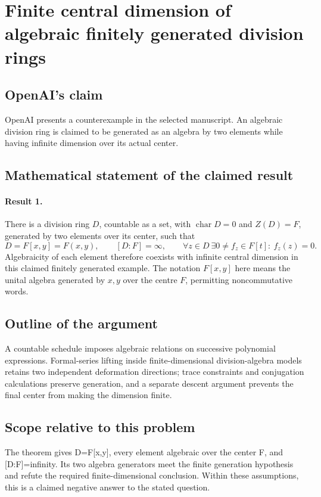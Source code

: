 \documentclass[11pt]{article}
\begin{document}
\section*{Finite central dimension of algebraic finitely generated division rings}

\subsection{OpenAI's claim}
OpenAI presents a counterexample in the selected manuscript. An algebraic division ring is claimed to be generated as an algebra by two elements while having infinite dimension over its actual center.

\subsection{Mathematical statement of the claimed result}
\paragraph{Result 1.} There is a division ring \(D\), countable as a set, with \(\operatorname{char}D=0\) and \(Z(D)=F\), generated by two elements over its center, such that
\[
 D=F[x,y]=F(x,y),\qquad[D:F]=\infty,\qquad
 \forall z\in D\ \exists0\ne f_z\in F[t]:\ f_z(z)=0.
\]
Algebraicity of each element therefore coexists with infinite central dimension in this claimed finitely generated example. The notation $F[x,y]$ here means the unital algebra generated by $x,y$ over the centre $F$, permitting noncommutative words.

\subsection{Outline of the argument}
A countable schedule imposes algebraic relations on successive polynomial expressions. Formal-series lifting inside finite-dimensional division-algebra models retains two independent deformation directions; trace constraints and conjugation calculations preserve generation, and a separate descent argument prevents the final center from making the dimension finite.

\subsection{Scope relative to this problem}
The theorem gives D=F[x,y], every element algebraic over the center F, and [D:F]=infinity. Its two algebra generators meet the finite generation hypothesis and refute the required finite-dimensional conclusion. Within these assumptions, this is a claimed negative answer to the stated question.
\end{document}
